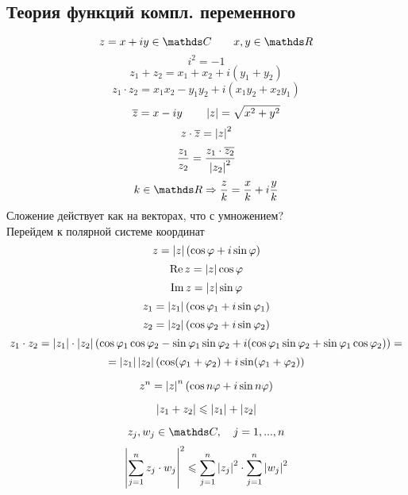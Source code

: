 \documentclass[12pt, fleqn]{article}
\begin{document}
\begin{lect}
		\section{Теория функций компл. переменного}
		\begin{Reminder}
		    \[z = x + iy \in \CC \qq x, y \in \R\]
			\[i^2 = -1\]
			\[z_1 + z_2 = x_1 + x_2 + i(y_1 + y_2)\]
			\[z_1 \cdot z_2 = x_1 x_2 - y_1 y_2 + i(x_1 y_2  + x_2 y_1)\]
			\[\overline{z} = x - iy \qquad \left|z\right| = \sqrt{x^2 + y^2}\]
			\[z \cdot \overline{z} = \left|z\right|^2\]
			\[\frac{z_1}{z_2} = \frac{z_1 \cdot \overline{z_2}}{\left|z_2\right|^2}\]
			\[k \in \R \Ra \frac{z}{k} = \frac{x}{k} + i \frac{y}{k}\]
			Сложение действует как на векторах, что с умножением?\\
			Перейдем к полярной системе координат
			\[z = \left|z\right| (\cos \varphi + i \sin \varphi)\]
			\[\mathop{\rm Re}\nolimits z = \left|z\right| \cos \varphi\]
			\[\mathop{\rm Im}\nolimits z = \left|z\right| \sin \varphi\]
			\[z_1 = \left|z_1\right| (\cos \varphi_1 + i \sin \varphi_1)\]
			\[z_2 = \left|z_2\right| (\cos \varphi_2 + i \sin \varphi_2)\]
			\[z_1 \cdot z_2 = \left|z_1\right| \cdot \left|z_2\right| 
			(\cos \varphi_1 \cos \varphi_2 - \sin \varphi_1 \sin \varphi_2 
		    +i(\cos \varphi_1 \sin \varphi_2 + \sin \varphi_1 \cos \varphi_2)) = \]
			\[ = \left|z_1\right| \left|z_2\right| (\cos(\varphi_1 + \varphi_2) + 
			i \sin (\varphi_1 + \varphi_2))\]
		\end{Reminder}

		\begin{Theorem} [Ф-ла Муавра]
			\[z^n = \left|z\right|^n (\cos{n \varphi} + i \sin n \varphi )\]
		\end{Theorem}

		\begin{Definition} [н-во \bigtriangleup]
			\[\left|z_1 + z_2\right| \leqslant \left|z_1\right| + \left|z_2\right|\]
		\end{Definition}

		\begin{Definition} [н-во Коши]
		    \[z_j, w_j \in \CC, \q j = 1, ..., n\]
			\[\left|\sum_{j = 1}^n z_j \cdot w_j\right|^2 \leqslant \sum_{j = 1}^n 
			\left|z_j\right|^2 \cdot \sum_{j = 1}^n \left|w_j\right|^2 \]
		\end{Definition}


\end{lect}
\end{document}
